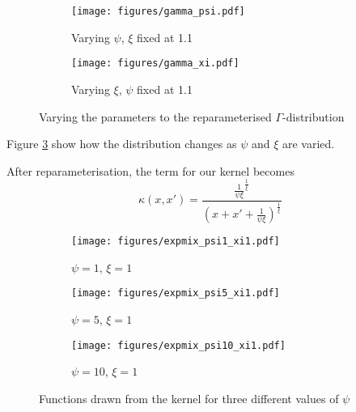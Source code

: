 \documentclass[a4paper,12pt,twoside,openright]{report}
\begin{document}
\begin{figure}
\centering
\begin{subfigure}{.5\textwidth}
  \centering
  \texttt{[image: figures/gamma\_psi.pdf]}
  \caption{Varying $\psi$, $\xi$ fixed at 1.1}
  \label{gammapsi}
\end{subfigure}%
\begin{subfigure}{.5\textwidth}
  \centering
  \texttt{[image: figures/gamma\_xi.pdf]}
  \caption{Varying $\xi$, $\psi$ fixed at 1.1}
  \label{gammaxi}
\end{subfigure}
\caption{Varying the parameters to the reparameterised $\Gamma$-distribution}
\label{gammadist}
\end{figure}


Figure \ref{gammadist} show how the distribution changes as $\psi$ and $\xi$ are varied.

After reparameterisation, the term for our kernel becomes
\begin{equation}
\kappa(x, x') = \frac{\frac{1}{\psi\xi}^{\frac{1}{\xi}}}{(x+x'+\frac{1}{\psi\xi})^{\frac{1}{\xi}}}
\end{equation}

\begin{figure}
\centering
\begin{subfigure}{.33\textwidth}
  \centering
  \texttt{[image: figures/expmix\_psi1\_xi1.pdf]}
  \caption{$\psi=1$, $\xi=1$}
  \label{expmix11}
\end{subfigure}%
\begin{subfigure}{.33\textwidth}
  \centering
  \texttt{[image: figures/expmix\_psi5\_xi1.pdf]}
  \caption{$\psi=5$, $\xi=1$}
  \label{expmix51}
\end{subfigure}%
\begin{subfigure}{.33\textwidth}
  \centering
  \texttt{[image: figures/expmix\_psi10\_xi1.pdf]}
  \caption{$\psi=10$, $\xi=1$}
  \label{expmix101}
\end{subfigure}
\caption{Functions drawn from the kernel for three different values of $\psi$}
\label{kernelpsi}
\end{figure}
\end{document}
